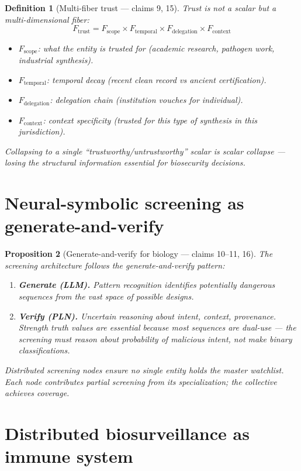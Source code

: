 \documentclass[11pt,a4paper]{article}
\newtheorem{definition}{Definition}[section]
\newtheorem{proposition}[definition]{Proposition}
\begin{document}
\begin{definition}[Multi-fiber trust --- claims 9, 15]
\label{def:trust}
Trust is not a scalar but a multi-dimensional fiber:
\[
  F_{\text{trust}} = F_{\text{scope}} \times F_{\text{temporal}}
    \times F_{\text{delegation}} \times F_{\text{context}}
\]
\begin{itemize}
  \item $F_{\text{scope}}$: what the entity is trusted for (academic
    research, pathogen work, industrial synthesis).
  \item $F_{\text{temporal}}$: temporal decay (recent clean record vs
    ancient certification).
  \item $F_{\text{delegation}}$: delegation chain (institution vouches
    for individual).
  \item $F_{\text{context}}$: context specificity (trusted for this
    type of synthesis in this jurisdiction).
\end{itemize}
Collapsing to a single ``trustworthy/untrustworthy'' scalar is
scalar collapse --- losing the structural information essential for
biosecurity decisions.
\end{definition}

\section{Neural-symbolic screening as generate-and-verify}

\begin{proposition}[Generate-and-verify for biology --- claims 10--11, 16]
\label{prop:screening}
The screening architecture follows the generate-and-verify pattern:
\begin{enumerate}
  \item \textbf{Generate (LLM).} Pattern recognition identifies
    potentially dangerous sequences from the vast space of possible
    designs.
  \item \textbf{Verify (PLN).} Uncertain reasoning about intent,
    context, provenance. Strength truth values are essential because
    most sequences are dual-use --- the screening must reason about
    probability of malicious intent, not make binary classifications.
\end{enumerate}
Distributed screening nodes ensure no single entity holds the master
watchlist. Each node contributes partial screening from its specialization;
the collective achieves coverage.
\end{proposition}

\section{Distributed biosurveillance as immune system}
\end{document}
